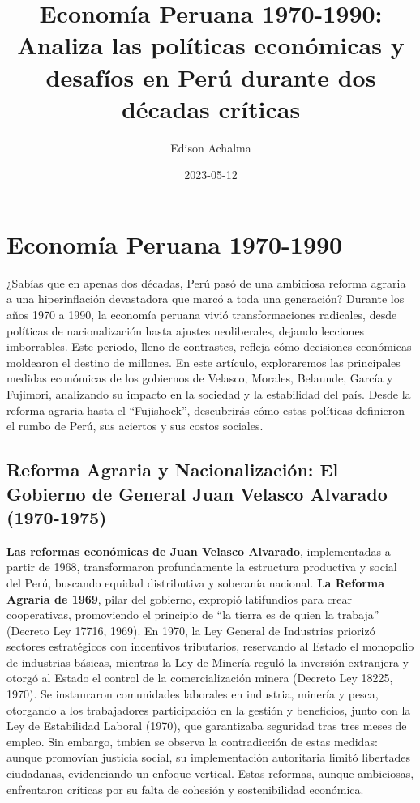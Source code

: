 \documentclass[
  jou,
  floatsintext,
  longtable,
  a4paper,
  nolmodern,
  notxfonts,
  notimes,
  colorlinks=true,linkcolor=blue,citecolor=blue,urlcolor=blue]{apa7}
\title{Economía Peruana 1970-1990: Analiza las políticas económicas y
desafíos en Perú durante dos décadas críticas}
\author{Edison Achalma}
\affiliation{
{Escuela Profesional de Economía, Universidad Nacional de San Cristóbal
de Huamanga}}
\date{2023-05-12}
\begin{document}
\maketitle

\hypertarget{toc}{}
\tableofcontents
\newpage
\section[Introduction]{Economía Peruana 1970-1990}

\setcounter{secnumdepth}{-\maxdimen} %

\setlength\LTleft{0pt}


¿Sabías que en apenas dos décadas, Perú pasó de una ambiciosa reforma
agraria a una hiperinflación devastadora que marcó a toda una
generación? Durante los años 1970 a 1990, la economía peruana vivió
transformaciones radicales, desde políticas de nacionalización hasta
ajustes neoliberales, dejando lecciones imborrables. Este periodo, lleno
de contrastes, refleja cómo decisiones económicas moldearon el destino
de millones. En este artículo, exploraremos las principales medidas
económicas de los gobiernos de Velasco, Morales, Belaunde, García y
Fujimori, analizando su impacto en la sociedad y la estabilidad del
país. Desde la reforma agraria hasta el ``Fujishock'', descubrirás cómo
estas políticas definieron el rumbo de Perú, sus aciertos y sus costos
sociales.

\subsection{Reforma Agraria y Nacionalización: El Gobierno de General
Juan Velasco Alvarado
(1970-1975)}\label{reforma-agraria-y-nacionalizaciuxf3n-el-gobierno-de-general-juan-velasco-alvarado-1970-1975}

\textbf{Las reformas económicas de Juan Velasco Alvarado}, implementadas
a partir de 1968, transformaron profundamente la estructura productiva y
social del Perú, buscando equidad distributiva y soberanía nacional.
\textbf{La Reforma Agraria de 1969}, pilar del gobierno, expropió
latifundios para crear cooperativas, promoviendo el principio de ``la
tierra es de quien la trabaja'' (Decreto Ley 17716, 1969). En 1970, la
Ley General de Industrias priorizó sectores estratégicos con incentivos
tributarios, reservando al Estado el monopolio de industrias básicas,
mientras la Ley de Minería reguló la inversión extranjera y otorgó al
Estado el control de la comercialización minera (Decreto Ley 18225,
1970). Se instauraron comunidades laborales en industria, minería y
pesca, otorgando a los trabajadores participación en la gestión y
beneficios, junto con la Ley de Estabilidad Laboral (1970), que
garantizaba seguridad tras tres meses de empleo. Sin embargo, tmbien se
observa la contradicción de estas medidas: aunque promovían justicia
social, su implementación autoritaria limitó libertades ciudadanas,
evidenciando un enfoque vertical. Estas reformas, aunque ambiciosas,
enfrentaron críticas por su falta de cohesión y sostenibilidad
económica.
\end{document}
